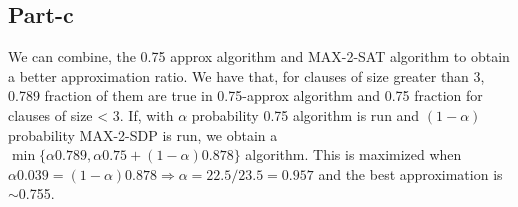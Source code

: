 \documentclass{article}
\begin{document}
\subsection*{Part-c}
We can combine, the 0.75 approx algorithm and MAX-2-SAT algorithm to obtain a better approximation ratio. We have that, for clauses of size greater than 3, 0.789 fraction of them are
true in 0.75-approx algorithm and 0.75 fraction for clauses of size < 3. If,  with $\alpha$ probability 0.75 algorithm is run and $(1-\alpha)$ probability MAX-2-SDP is run, we obtain a $\min\{\alpha 0.789, \alpha 0.75 + (1 - \alpha)0.878\}$ algorithm. This is maximized when $\alpha 0.039 = (1 - \alpha)0.878 \Rightarrow \alpha = 22.5/23.5 = 0.957$ and the best approximation is $\sim$0.755.
\end{document}
